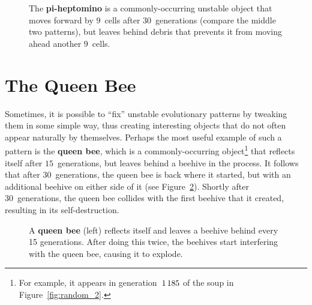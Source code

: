 \begin{figure}[!htb]
	\centering
	\caption{The \textbf{pi-heptomino} is a commonly-occurring unstable object that moves forward by $9$~cells after $30$~generations (compare the middle two patterns), but leaves behind debris that prevents it from moving ahead another $9$~cells.}\label{fig:pi_heptomino}
\end{figure}


\section{The Queen Bee}\label{sec:queen_bee}

Sometimes, it is possible to ``fix'' unstable evolutionary patterns by tweaking them in some simple way, thus creating interesting objects that do not often appear naturally by themselves. Perhaps the most useful example of such a pattern is the \textbf{queen bee}, which is a commonly-occurring object\footnote{For example, it appears in generation~$1{\,}185$ of the soup in Figure~\ref{fig:random_2}.} that reflects itself after $15$~generations, but leaves behind a beehive in the process. It follows that after 30~generations, the queen bee is back where it started, but with an additional beehive on either side of it (see Figure~\ref{fig:queen_bee}). Shortly after 30~generations, the queen bee collides with the first beehive that it created, resulting in its self-destruction.

\begin{figure}[!htb]
	\centering{}
	\caption{A \textbf{queen bee} (left) reflects itself and leaves a beehive behind every 15 generations. After doing this twice, the beehives start interfering with the queen bee, causing it to explode.}\label{fig:queen_bee}
\end{figure}


